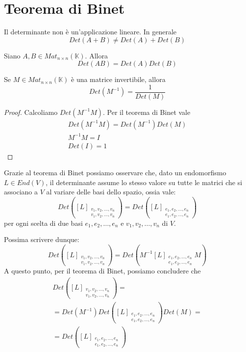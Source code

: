 \section{Teorema di Binet}
Il determinante non \`e un'applicazione lineare. In generale
\[ Det(A + B) \neq Det(A) + Det(B) \]

\begin{theorem}
	Siano $A, B \in Mat_{n \times n}(\mathbb{K})$. Allora
	\begin{equation*}
		Det(AB) = Det(A)Det(B)
	\end{equation*}
\end{theorem}

\begin{corollary}
	Se $M \in Mat_{n \times n}(\mathbb{K})$ \`e una matrice invertibile, allora
	\begin{equation*}
		Det(M^{-1}) = \frac{1}{Det(M)}
	\end{equation*}
	\begin{proof}
		Calcoliamo $Det(M^{-1} M)$. Per il teorema di Binet vale
		\begin{gather*}
			Det(M^{-1} M) = Det(M^{-1})Det(M) \\
			M^{-1}M = I \\
			Det(I) = 1
		\end{gather*}
	\end{proof}
\end{corollary}

Grazie al teorema di Binet possiamo osservare che, dato un endomorfismo
$L \in End(V)$, il determinante assume lo stesso valore su tutte le matrici
che si associano a $V$ al variare delle basi dello spazio, ossia vale:
\begin{equation*}
	Det \left(
	[L]_{\substack{
			v_1, v_2, \dots, v_n \\
			v_1, v_2, \dots, v_n
		}}
	\right) =
	Det \left(
	[L]_{\substack{
			e_1, e_2, \dots, e_n \\
			e_1, e_2, \dots, e_n
		}}
	\right)
\end{equation*}
per ogni scelta di due basi $e_1, e_2, \dots, e_n$ e $v_1, v_2, \dots, v_n$
di $V$.

Possima scrivere dunque:
\begin{equation*}
	Det \left(
	[L]_{\substack{
			v_1, v_2, \dots, v_n \\
			v_1, v_2, \dots, v_n
		}}
	\right) =
	Det \left(
	M^{-1}[L]_{\substack{
			e_1, e_2, \dots, e_n \\
			e_1, e_2, \dots, e_n
		}} M
	\right)
\end{equation*}
A questo punto, per il teorema di Binet, possiamo concludere che
\begin{gather*}
	Det \left(
	[L]_{\substack{
			v_1, v_2, \dots, v_n \\
			v_1, v_2, \dots, v_n
		}}
	\right) = \\
	= Det(M^{-1}) Det \left(
	[L]_{\substack{
			e_1, e_2, \dots, e_n \\
			e_1, e_2, \dots, e_n
		}}
	\right) Det(M) = \\
	= Det \left(
	[L]_{\substack{
			e_1, e_2, \dots, e_n \\
			e_1, e_2, \dots, e_n
		}}
	\right)
\end{gather*}

